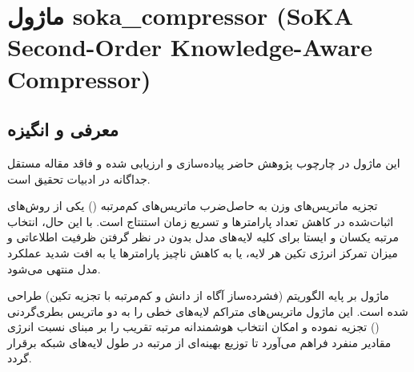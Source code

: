 \section{ماژول soka\_compressor (SoKA Second-Order Knowledge-Aware Compressor)}
\label{sec:module_soka_compressor}

\subsection{معرفی و انگیزه}
این ماژول در چارچوب پژوهش حاضر پیاده‌سازی و ارزیابی شده و فاقد مقاله مستقل جداگانه در ادبیات تحقیق است.

تجزیه ماتریس‌های وزن به حاصل‌ضرب ماتریس‌های کم‌مرتبه () یکی از روش‌های اثبات‌شده در کاهش تعداد پارامترها و تسریع زمان استنتاج است. با این حال، انتخاب مرتبه یکسان و ایستا برای کلیه لایه‌های مدل بدون در نظر گرفتن ظرفیت اطلاعاتی و میزان تمرکز انرژی تکین هر لایه، یا به کاهش ناچیز پارامترها یا به افت شدید عملکرد مدل منتهی می‌شود.

ماژول  بر پایه الگوریتم  (فشرده‌ساز آگاه از دانش و کم‌مرتبه با تجزیه تکین) طراحی شده است. این ماژول ماتریس‌های متراکم لایه‌های خطی را به دو ماتریس بطری‌گردنی () تجزیه نموده و امکان انتخاب هوشمندانه مرتبه تقریب را بر مبنای نسبت انرژی مقادیر منفرد فراهم می‌آورد تا توزیع بهینه‌ای از مرتبه در طول لایه‌های شبکه برقرار گردد.

